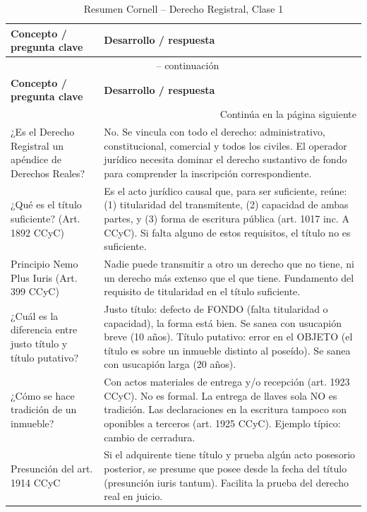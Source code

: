 \documentclass[12pt,oneside]{book}
\begin{document}
\begin{longtable}{p{} p{}}
\caption{Resumen Cornell -- Derecho Registral, Clase 1} \label{tab:cornell} \\
\toprule
\textbf{Concepto / pregunta clave} & \textbf{Desarrollo / respuesta} \\
\midrule
\endfirsthead
\multicolumn{2}{c}{\tablename\ \thetable{} -- continuación} \\
\toprule
\textbf{Concepto / pregunta clave} & \textbf{Desarrollo / respuesta} \\
\midrule
\endhead
\midrule
\multicolumn{2}{r}{Continúa en la página siguiente} \\
\endfoot
\bottomrule
\endlastfoot

¿Es el Derecho Registral un apéndice de Derechos Reales? &
No. Se vincula con todo el derecho: administrativo, constitucional, comercial y todos los civiles. El operador jurídico necesita dominar el derecho sustantivo de fondo para comprender la inscripción correspondiente. \\

¿Qué es el título suficiente? (Art. 1892 CCyC) &
Es el acto jurídico causal que, para ser suficiente, reúne: (1) titularidad del transmitente, (2) capacidad de ambas partes, y (3) forma de escritura pública (art. 1017 inc. A CCyC). Si falta alguno de estos requisitos, el título no es suficiente. \\

Principio Nemo Plus Iuris (Art. 399 CCyC) &
Nadie puede transmitir a otro un derecho que no tiene, ni un derecho más extenso que el que tiene. Fundamento del requisito de titularidad en el título suficiente. \\

¿Cuál es la diferencia entre justo título y título putativo? &
Justo título: defecto de FONDO (falta titularidad o capacidad), la forma está bien. Se sanea con usucapión breve (10 años). Título putativo: error en el OBJETO (el título es sobre un inmueble distinto al poseído). Se sanea con usucapión larga (20 años). \\

¿Cómo se hace tradición de un inmueble? &
Con actos materiales de entrega y/o recepción (art. 1923 CCyC). No es formal. La entrega de llaves sola NO es tradición. Las declaraciones en la escritura tampoco son oponibles a terceros (art. 1925 CCyC). Ejemplo típico: cambio de cerradura. \\

Presunción del art. 1914 CCyC &
Si el adquirente tiene título y prueba algún acto posesorio posterior, se presume que posee desde la fecha del título (presunción iuris tantum). Facilita la prueba del derecho real en juicio. \\


\end{longtable}
\end{document}
